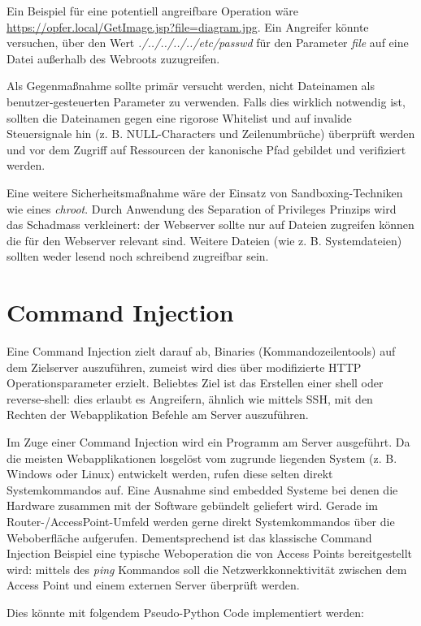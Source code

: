 Ein Beispiel für eine potentiell angreifbare Operation wäre \url{https://opfer.local/GetImage.jsp?file=diagram.jpg}. Ein Angreifer könnte versuchen, über den Wert \textit{./../../../../etc/passwd} für den Parameter \textit{file} auf eine Datei außerhalb des Webroots zuzugreifen.

Als Gegenmaßnahme sollte primär versucht werden, nicht Dateinamen als benutzer-gesteuerten Parameter zu verwenden. Falls dies wirklich notwendig ist, sollten die Dateinamen gegen eine rigorose Whitelist und auf invalide Steuersignale hin (z. B. NULL-Characters und Zeilenumbrüche) überprüft werden und vor dem Zugriff auf Ressourcen der kanonische Pfad gebildet und verifiziert werden.

Eine weitere Sicherheitsmaßnahme wäre der Einsatz von Sandboxing-Techniken wie eines \textit{chroot}. Durch Anwendung des Separation of Privileges Prinzips wird das Schadmass verkleinert: der Webserver sollte nur auf Dateien zugreifen können die für den Webserver relevant sind. Weitere Dateien (wie z. B. Systemdateien) sollten weder lesend noch schreibend zugreifbar sein.

\section{Command Injection}

Eine Command Injection zielt darauf ab, Binaries (Kommandozeilentools) auf dem Zielserver auszuführen, zumeist wird dies über modifizierte HTTP Operationsparameter erzielt. Beliebtes Ziel ist das Erstellen einer shell oder reverse-shell: dies erlaubt es Angreifern, ähnlich wie mittels SSH, mit den Rechten der Webapplikation Befehle am Server auszuführen.

Im Zuge einer Command Injection wird ein Programm am Server ausgeführt. Da die meisten Webapplikationen losgelöst vom zugrunde liegenden System (z. B. Windows oder Linux) entwickelt werden, rufen diese selten direkt Systemkommandos auf. Eine Ausnahme sind embedded Systeme bei denen die Hardware zusammen mit der Software gebündelt geliefert wird. Gerade im Router-/AccessPoint-Umfeld werden gerne direkt Systemkommandos über die Weboberfläche aufgerufen. Dementsprechend ist das klassische Command Injection Beispiel eine typische Weboperation die von Access Points bereitgestellt wird: mittels des \textit{ping} Kommandos soll die Netzwerkkonnektivität zwischen dem Access Point und einem externen Server überprüft werden.

Dies könnte mit folgendem Pseudo-Python Code implementiert werden:

